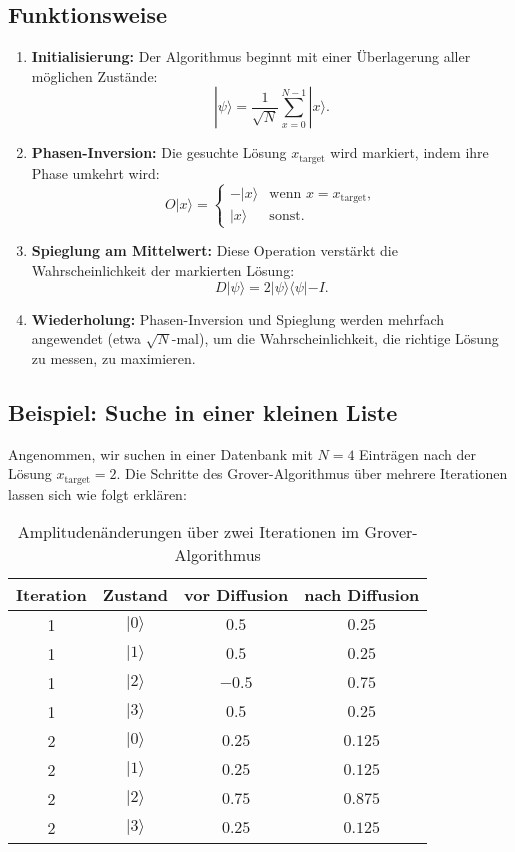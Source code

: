 \subsection{Funktionsweise}
\begin{enumerate}
    \item \textbf{Initialisierung:} Der Algorithmus beginnt mit einer Überlagerung aller möglichen Zustände:
        \[
        |\psi\rangle = \frac{1}{\sqrt{N}} \sum_{x=0}^{N-1} |x\rangle.
        \]

    \item \textbf{Phasen-Inversion:} Die gesuchte Lösung $x_{\text{target}}$ wird markiert, indem ihre Phase umkehrt wird:
        \[
        O |x\rangle = \begin{cases} 
            -|x\rangle & \text{wenn } x = x_{\text{target}}, \\
            |x\rangle & \text{sonst}.
        \end{cases}
        \]

    \item \textbf{Spieglung am Mittelwert:} Diese Operation verstärkt die Wahrscheinlichkeit der markierten Lösung:
        \[
        D |\psi\rangle = 2|\psi\rangle\langle\psi| - I.
        \]

    \item \textbf{Wiederholung:} Phasen-Inversion und Spieglung werden mehrfach angewendet (etwa $\sqrt{N}$-mal), um die 
    Wahrscheinlichkeit, die richtige Lösung zu messen, zu maximieren.
\end{enumerate}

\subsection{Beispiel: Suche in einer kleinen Liste}
Angenommen, wir suchen in einer Datenbank mit $N=4$ Einträgen nach der Lösung $x_{\text{target}}=2$. Die Schritte des 
Grover-Algorithmus über mehrere Iterationen lassen sich wie folgt erklären:

\begin{table}[H]
    \centering
    \begin{tabular}{|c|c|c|c|}
        \hline
        Iteration & Zustand & vor Diffusion & nach Diffusion \\
        \hline
        1 & $|0\rangle$ & $0.5$ & $0.25$ \\
        1 & $|1\rangle$ & $0.5$ & $0.25$ \\
        1 & $|2\rangle$ & $-0.5$ & $0.75$ \\
        1 & $|3\rangle$ & $0.5$ & $0.25$ \\
        \hline
        2 & $|0\rangle$ & $0.25$ & $0.125$ \\
        2 & $|1\rangle$ & $0.25$ & $0.125$ \\
        2 & $|2\rangle$ & $0.75$ & $0.875$ \\
        2 & $|3\rangle$ & $0.25$ & $0.125$ \\
        \hline
    \end{tabular}
    \caption{Amplitudenänderungen über zwei Iterationen im Grover-Algorithmus}
\end{table}

